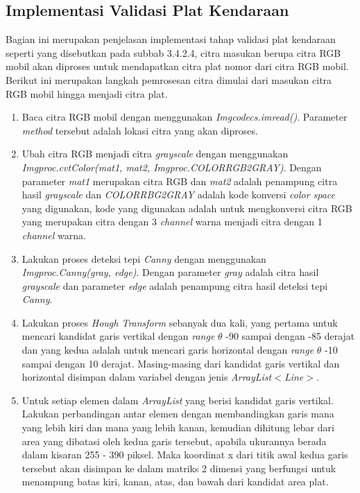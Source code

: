 \subsection{Implementasi Validasi Plat Kendaraan}
\noindent Bagian ini merupakan penjelasan implementasi tahap validasi plat kendaraan seperti yang disebutkan pada subbab 3.4.2.4, citra masukan berupa citra RGB mobil akan diproses untuk mendapatkan citra plat nomor dari citra RGB mobil. Berikut ini merupakan langkah pemrosesan citra dimulai dari masukan citra RGB mobil hingga menjadi citra plat.
\begin{enumerate}
	\item Baca citra RGB mobil dengan menggunakan \textit{Imgcodecs.imread()}. Parameter \textit{method} tersebut adalah lokasi citra yang akan diproses.
	\item Ubah citra RGB menjadi citra \textit{grayscale} dengan menggunakan \textit{Imgproc.cvtColor(mat1, mat2, Imgproc.COLORRGB2GRAY)}. Dengan parameter \textit{mat1} merupakan citra RGB dan \textit{mat2} adalah penampung citra hasil \textit{grayscale} dan \textit{COLORRBG2GRAY} adalah kode konversi \textit{color space} yang digunakan, kode yang digunakan adalah untuk mengkonversi citra RGB yang merupakan citra dengan 3 \textit{channel} warna menjadi citra dengan 1 \textit{channel} warna.
	\item Lakukan proses deteksi tepi \textit{Canny} dengan menggunakan \textit{Imgproc.Canny(gray, edge)}. Dengan parameter \textit{gray} adalah citra hasil \textit{grayscale} dan parameter \textit{edge} adalah penampung citra hasil deteksi tepi \textit{Canny}.
	\item Lakukan proses \textit{Hough Transform} sebanyak dua kali, yang pertama untuk mencari kandidat garis vertikal dengan \textit{range} $\theta$ -90 sampai dengan -85 derajat dan yang kedua adalah untuk mencari garis horizontal dengan \textit{range} $\theta$ -10 sampai dengan 10 derajat. Masing-masing dari kandidat garis vertikal dan horizontal disimpan dalam variabel dengan jenis \textit{ArrayList$<$Line$>$}.
	\item Untuk setiap elemen dalam \textit{ArrayList} yang berisi kandidat garis vertikal. Lakukan perbandingan antar elemen dengan membandingkan garis mana yang lebih kiri dan mana yang lebih kanan, kemudian dihitung lebar dari area yang dibatasi oleh kedua garis tersebut, apabila ukurannya berada dalam kisaran 255 - 390 piksel. Maka koordinat x dari titik awal kedua garis tersebut akan disimpan ke dalam matriks 2 dimensi yang berfungsi untuk menampung batas kiri, kanan, atas, dan bawah dari kandidat area plat.

\end{enumerate}
